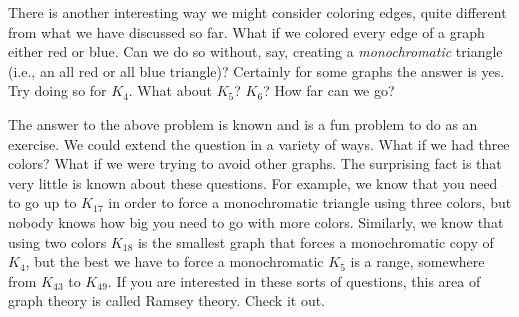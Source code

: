 \documentclass[12pt]{article}
\begin{document}
There is another interesting way we might consider coloring edges, quite different from what we have discussed so far.  What if we colored every edge of a graph either red or blue.  Can we do so without, say, creating a \emph{monochromatic} triangle (i.e., an all red or all blue triangle)?  Certainly for some graphs the answer is yes. Try doing so for $K_4$.  What about $K_5$?  $K_6$?  How far can we go?

The answer to the above problem is known and is a fun problem to do as an exercise.  We could extend the question in a variety of ways.  What if we had three colors?  What if we were trying to avoid other graphs.  The surprising fact is that very little is known about these questions.  For example, we know that you need to go up to $K_{17}$ in order to force a monochromatic triangle using three colors, but nobody knows how big you need to go with more colors.  Similarly, we know that using two colors $K_{18}$ is the smallest graph that forces a monochromatic copy of $K_4$, but the best we have to force a monochromatic $K_{5}$ is a range, somewhere from $K_{43}$ to $K_{49}$.  If you are interested in these sorts of questions, this area of graph theory is called Ramsey theory.  Check it out.
\end{document}
